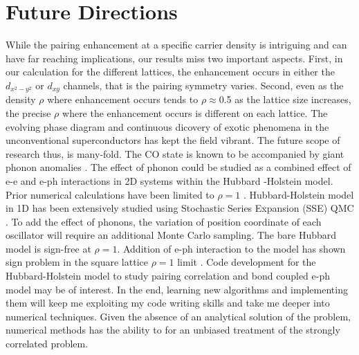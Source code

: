 \documentclass[a4paper,12pt]{article}
\begin{document}
\section{Future Directions}
While the pairing enhancement at a specific carrier density is intriguing and can have far reaching implications,
our results miss two important aspects. First, in our calculation for the different lattices, the enhancement occurs in either the 
$d_{x^2-y^2}$ or $d_{xy}$ channels, that is the pairing symmetry varies. Second, even as the density $\rho$ where enhancement occurs tends to $\rho \approx$0.5
as the lattice size increases, the precise $\rho$ where the enhancement occurs is different on each lattice. 
The evolving phase diagram and continuous dicovery of exotic phenomena in the unconventional superconductors has kept the field vibrant. 
The future scope of research thus, is many-fold. 
The CO state is known to be accompanied by giant phonon anomalies \cite{liu15a}. The effect of phonon
could be studied as a combined effect of e-e and e-ph interactions in 2D systems within the Hubbard -Holstein model. 
Prior numerical calculations have been limited to $\rho=1$  \cite{nowadnick12a,johnston13a}. Hubbard-Holstein model in 1D has been extensively
studied using Stochastic Series Expansion (SSE) QMC \cite{clay05a,hardikar07a}. To add the effect of phonons, the variation of
position coordinate of each oscillator will require an additional Monte Carlo sampling. The bare Hubbard model is 
sign-free at $\rho=1$. Addition of e-ph interaction to the model has shown sign problem in the square lattice $\rho=1$ limit \cite{johnston13a}. 
Code development for the Hubbard-Holstein model to study pairing correlation and bond coupled e-ph model may be of interest.   
In the end, learning new algorithms and implementing them will keep me exploiting my code writing skills and take me deeper into numerical techniques.
Given the absence of an analytical solution of the problem, numerical methods has the ability to for an unbiased 
treatment of the strongly correlated problem. 
%

  
\end{document}
